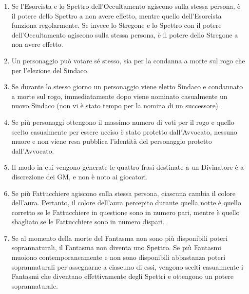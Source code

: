 \documentclass[a4paper,10pt]{article}
\begin{document}
\begin{enumerate}
	\item Se l'Esorcista e lo Spettro dell'Occultamento agiscono sulla stessa persona, è il potere dello Spettro a non avere effetto, mentre quello dell'Esorcista funziona regolarmente. Se invece lo Stregone e lo Spettro con il potere dell'Occultamento agiscono sulla stessa persona, è il potere dello Stregone a non avere effetto.
	
	\item Un personaggio può votare sé stesso, sia per la condanna a morte sul rogo che per l'elezione del Sindaco.
	
	\item Se durante lo stesso giorno un personaggio viene eletto Sindaco e condannato a morte sul rogo, immediatamente dopo viene nominato casualmente un nuovo Sindaco (non vi è stato tempo per la nomina di un successore).
	
	\item Se più personaggi ottengono il massimo numero di voti per il rogo e quello scelto casualmente per essere ucciso è stato protetto dall'Avvocato, nessuno muore e non viene resa pubblica l'identità del personaggio protetto dall'Avvocato.
	
	\item Il modo in cui vengono generate le quattro frasi destinate a un Divinatore è a discrezione dei GM, e non è noto ai giocatori.
	
	\item Se più Fattucchiere agiscono sulla stessa persona, ciascuna cambia il colore dell'aura. Pertanto, il colore dell'aura percepito durante quella notte è quello corretto se le Fattucchiere in questione sono in numero pari, mentre è quello sbagliato se le Fattucchiere sono in numero dispari.
	
	\item Se al momento della morte del Fantasma non sono più disponibili poteri soprannaturali, il Fantasma non diventa uno Spettro. Se più Fantasmi muoiono contemporaneamente e non sono disponibili abbastanza poteri soprannaturali per assegnarne a ciascuno di essi, vengono scelti casualmente i Fantasmi che diventano effettivamente degli Spettri e ottengono un potere soprannaturale.
	

\end{enumerate}
\end{document}
